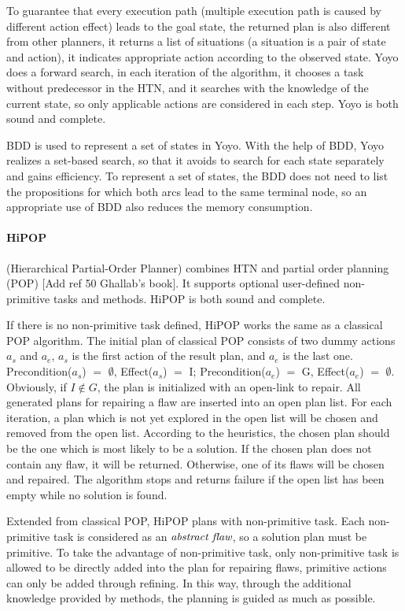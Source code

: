 To guarantee that every execution path (multiple execution path is caused by different action effect) leads to the goal state, the returned plan is also different from other planners, it returns a list of situations (a situation is a pair of state and action), it indicates appropriate action according to the observed state. Yoyo does a forward search, in each iteration of the algorithm, it chooses a task without predecessor in the HTN, and it searches with the knowledge of the current state, so only applicable actions are considered in each step. Yoyo is both sound and complete. 

BDD is used to represent a set of states in Yoyo. With the help of BDD, Yoyo realizes a set-based search, so that it avoids to search for each state separately and gains efficiency. To represent a set of states, the BDD does not need to list the propositions for which both arcs lead to the same terminal node, so an appropriate use of BDD also reduces the memory consumption.

\paragraph*{HiPOP}

\cite{hipop} (Hierarchical Partial-Order Planner) combines HTN and partial order planning (POP) [Add ref 50 Ghallab's book]. It supports optional user-defined non-primitive tasks and methods. HiPOP is both sound and complete. 

If there is no non-primitive task defined, HiPOP works the same as a classical POP algorithm. The initial plan of classical POP consists of two dummy actions $a_s$ and $a_e$, $a_s$ is the first action of the result plan, and $a_e$ is the last one. Precondition($a_s$) $=$ $\emptyset$, Effect($a_s$) $=$ I; Precondition($a_e$) $=$ G, Effect($a_e$) $=$ $\emptyset$. Obviously, if $I \not\in G$, the plan is initialized with an open-link to repair. All generated plans for repairing a flaw are inserted into an open plan list. For each iteration, a plan which is not yet explored in the open list will be chosen and removed from the open list. According to the heuristics, the chosen plan should be the one which is most likely to be a solution. If the chosen plan does not contain any flaw, it will be returned. Otherwise, one of its flaws will be chosen and repaired. The algorithm stops and returns failure if the open list has been empty while no solution is found.

Extended from classical POP, HiPOP plans with non-primitive task. Each non-primitive task is considered as an $\emph{abstract flaw}$, so a solution plan must be primitive. To take the advantage of non-primitive task, only non-primitive task is allowed to be directly added into the plan for repairing flaws, primitive actions can only be added through refining. In this way, through the additional knowledge provided by methods, the planning is guided as much as possible.

